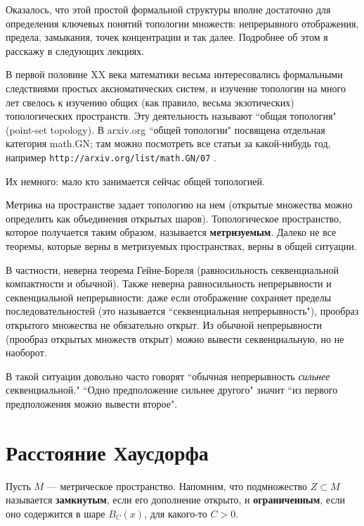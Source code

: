 \documentclass[12pt]{book}
\theoremstyle{upshape}
\theoremstyle{generic}
\def\еза{\end{remark}}
\theoremstyle{upshapenonumber}
\newcommand{\следствие}{%
     \refstepcounter{teorema}
     {\noindent\bf Следствие \thechapter.\arabic{teorema}:\ }}
\newcommand{\пример}{%
     \refstepcounter{teorema}
     {\noindent\bf Пример \thechapter.\arabic{teorema}:\ }}
\newcommand{\лемма}{%
     \refstepcounter{teorema}
     {\noindent\bf Лемма \thechapter.\arabic{teorema}:\ }}
\newcommand{\теорема}{%
     \refstepcounter{teorema}
     {\noindent\bf Теорема \thechapter.\arabic{teorema}:\ }}
\newcommand{\утверждение}{%
     \refstepcounter{teorema}
     {\noindent\bf Утверждение \thechapter.\arabic{teorema}:\ }}
\def\хфилл{\hfill}
\def\бф{\bf}
\def\ем{\em}
\def\ез{\end{zadacha}}
\def\еу{\end{ukazanie}}
\def\ео{\end{opredelenie}}
\def\енум{\begin{enumerate}}
\def\ее{\end{enumerate}}
\begin{document}
Оказалось, что этой простой формальной структуры
вполне достаточно для определения ключевых понятий
топологии множеств: непрерывного отображения,
предела, замыкания, точек концентрации и так далее.
Подробнее об этом я расскажу в следующих лекциях.

В первой половине XX века математики весьма интересовались
формальными следствиями простых аксиоматических систем,
и изучение топологии на много лет свелось к изучению
общих (как правило, весьма экзотических) 
топологических пространств. Эту деятельность
называют ``общая топология" (point-set topology).
В arxiv.org ``общей топологии" посвящена отдельная
категория math.GN; там можно посмотреть все статьи
за какой-нибудь год, например {\tt \scriptsize http://arxiv.org/list/math.GN/07} . 

Их немного: мало кто занимается сейчас общей топологией.

\хфилл

Метрика на пространстве задает топологию на нем
(открытые множества можно определить как объединения
открытых шаров). Топологическое пространство,
которое получается таким образом, называется 
{\бф метризуемым}. Далеко не все теоремы, которые
верны в метризуемых пространствах, верны в общей
ситуации.

В частности, неверна теорема Гейне-Бореля
(равносильность секвенциальной компактности и обычной).
Также неверна равносильность непрерывности и
секвенциальной непрерывности: даже если отображение 
сохраняет пределы последовательностей (это называется 
``секвенциальная непрерывность"), прообраз
открытого множества не обязательно открыт.
Из обычной непрерывности (прообраз открытых
множеств открыт) можно вывести секвенциальную,
но не наоборот.

В такой ситуации довольно часто говорят
``обычная непрерывность {\ем сильнее} секвенциальной."
``Одно предположение сильнее другого" значит 
``из первого предположения можно вывести второе".



\section{Расстояние Хаусдорфа}


Пусть $M$ --- метрическое пространство.
Напомним, что подмножество $Z\subset M$ называется
{\бф замкнутым}, если его дополнение открыто, и
{\бф ограниченным}, если оно содержится в шаре $B_C(x)$,
для какого-то $C>0$.
\end{document}
